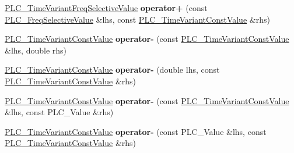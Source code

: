 \begin{DoxyCompactItemize}
\item 
\hypertarget{classns3_1_1PLC__TimeVariantConstValue_a2af198eff18574f291b5ecdbfd131851}{\hyperlink{classns3_1_1PLC__TimeVariantFreqSelectiveValue}{\-P\-L\-C\-\_\-\-Time\-Variant\-Freq\-Selective\-Value} {\bfseries operator+} (const \hyperlink{classns3_1_1PLC__FreqSelectiveValue}{\-P\-L\-C\-\_\-\-Freq\-Selective\-Value} \&lhs, const \hyperlink{classns3_1_1PLC__TimeVariantConstValue}{\-P\-L\-C\-\_\-\-Time\-Variant\-Const\-Value} \&rhs)}\label{classns3_1_1PLC__TimeVariantConstValue_a2af198eff18574f291b5ecdbfd131851}

\item 
\hypertarget{classns3_1_1PLC__TimeVariantConstValue_ab191f3fe641d3b197269d5973ed302ff}{\hyperlink{classns3_1_1PLC__TimeVariantConstValue}{\-P\-L\-C\-\_\-\-Time\-Variant\-Const\-Value} {\bfseries operator-\/} (const \hyperlink{classns3_1_1PLC__TimeVariantConstValue}{\-P\-L\-C\-\_\-\-Time\-Variant\-Const\-Value} \&lhs, double rhs)}\label{classns3_1_1PLC__TimeVariantConstValue_ab191f3fe641d3b197269d5973ed302ff}

\item 
\hypertarget{classns3_1_1PLC__TimeVariantConstValue_a3f86c206914729ada3a3a8d0e1f95b21}{\hyperlink{classns3_1_1PLC__TimeVariantConstValue}{\-P\-L\-C\-\_\-\-Time\-Variant\-Const\-Value} {\bfseries operator-\/} (double lhs, const \hyperlink{classns3_1_1PLC__TimeVariantConstValue}{\-P\-L\-C\-\_\-\-Time\-Variant\-Const\-Value} \&rhs)}\label{classns3_1_1PLC__TimeVariantConstValue_a3f86c206914729ada3a3a8d0e1f95b21}

\item 
\hypertarget{classns3_1_1PLC__TimeVariantConstValue_ab5442051e84c62af878e6fde3482df7f}{\hyperlink{classns3_1_1PLC__TimeVariantConstValue}{\-P\-L\-C\-\_\-\-Time\-Variant\-Const\-Value} {\bfseries operator-\/} (const \hyperlink{classns3_1_1PLC__TimeVariantConstValue}{\-P\-L\-C\-\_\-\-Time\-Variant\-Const\-Value} \&lhs, const \-P\-L\-C\-\_\-\-Value \&rhs)}\label{classns3_1_1PLC__TimeVariantConstValue_ab5442051e84c62af878e6fde3482df7f}

\item 
\hypertarget{classns3_1_1PLC__TimeVariantConstValue_a28d3fed98af25f9a7064647f55fde144}{\hyperlink{classns3_1_1PLC__TimeVariantConstValue}{\-P\-L\-C\-\_\-\-Time\-Variant\-Const\-Value} {\bfseries operator-\/} (const \-P\-L\-C\-\_\-\-Value \&lhs, const \hyperlink{classns3_1_1PLC__TimeVariantConstValue}{\-P\-L\-C\-\_\-\-Time\-Variant\-Const\-Value} \&rhs)}\label{classns3_1_1PLC__TimeVariantConstValue_a28d3fed98af25f9a7064647f55fde144}


\end{DoxyCompactItemize}
